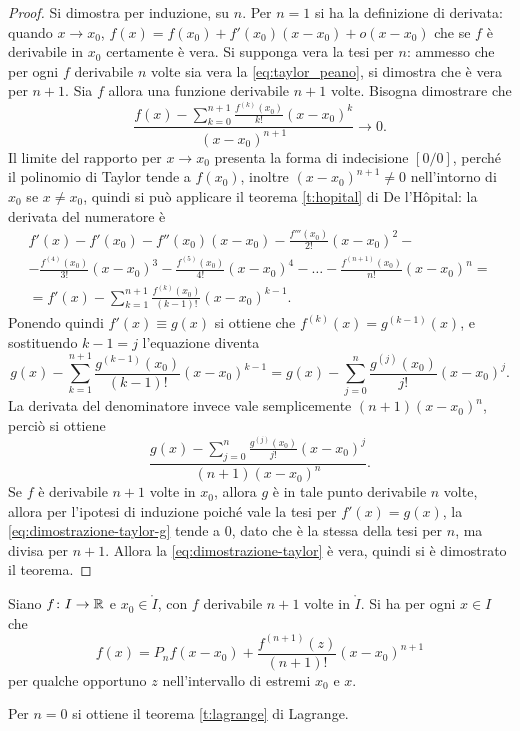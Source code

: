 \begin{proof}
Si dimostra per induzione, su $n$. Per $n=1$ si ha la definizione di derivata: quando $x\to x_0$, $f(x)=f(x_0)+f'(x_0)(x-x_0)+o(x-x_0)$ che se $f$ è derivabile in $x_0$ certamente è vera.
Si supponga vera la tesi per $n$: ammesso che per ogni $f$ derivabile $n$ volte sia vera la \eqref{eq:taylor_peano}, si dimostra che è vera per $n+1$. Sia $f$ allora una funzione derivabile $n+1$ volte. Bisogna dimostrare che
\begin{equation}
\label{eq:dimostrazione-taylor}
\frac{\displaystyle f(x)-\sum_{k=0}^{n+1}\frac{f^{(k)}(x_0)}{k!}(x-x_0)^k}{(x-x_0)^{n+1}}\to 0.
\end{equation}
Il limite del rapporto per $x\to x_0$ presenta la forma di indecisione $[0/0]$, perché il polinomio di Taylor tende a $f(x_0)$, inoltre $(x-x_0)^{n+1}\neq0$ nell'intorno di $x_0$ se $x\neq x_0$, quindi si può applicare il teorema \ref{t:hopital} di De l'H\^opital: la derivata del numeratore è
\begin{multline*}
f'(x)-f'(x_0)-f''(x_0)(x-x_0)-\frac{f'''(x_0)}{2!}(x-x_0)^2-\\
-\frac{f^{(4)}(x_0)}{3!}(x-x_0)^3-\frac{f^{(5)}(x_0)}{4!}(x-x_0)^4-\dots-\frac{f^{(n+1)}(x_0)}{n!}(x-x_0)^n=\\
=f'(x)-\sum_{k=1}^{n+1}\frac{f^{(k)}(x_0)}{(k-1)!}(x-x_0)^{k-1}.
\end{multline*}
Ponendo quindi $f'(x)\equiv g(x)$ si ottiene che $f^{(k)}(x)=g^{(k-1)}(x)$, e sostituendo $k-1=j$ l'equazione diventa
\[
g(x)-\sum_{k=1}^{n+1}\frac{g^{(k-1)}(x_0)}{(k-1)!}(x-x_0)^{k-1}=g(x)-\sum_{j=0}^{n}\frac{g^{(j)}(x_0)}{j!}(x-x_0)^j.
\]
La derivata del denominatore invece vale semplicemente $(n+1)(x-x_0)^n$, perciò si ottiene
\begin{equation}
\label{eq:dimostrazione-taylor-g}
\frac{\displaystyle g(x)-\sum_{j=0}^{n}\frac{g^{(j)}(x_0)}{j!}(x-x_0)^j}{(n+1)(x-x_0)^n}.
\end{equation}
Se $f$ è derivabile $n+1$ volte in $x_0$, allora $g$ è in tale punto derivabile $n$ volte, allora per l'ipotesi di induzione poiché vale la tesi per $f'(x)=g(x)$, la \eqref{eq:dimostrazione-taylor-g} tende a 0, dato che è la stessa della tesi per $n$, ma divisa per $n+1$. Allora la \eqref{eq:dimostrazione-taylor} è vera, quindi si è dimostrato il teorema.
\end{proof}
\begin{teorema}
\label{t:taylor_lagrange}
Siano $f\colon I\to\mathbb{R}$ e $x_0\in\mathring{I}$, con $f$ derivabile $n+1$ volte in $\mathring{I}$. Si ha per ogni $x\in I$ che
\begin{equation}
\label{eq:taylor_lagrange}
f(x)=P_nf(x-x_0)+\frac{f^{(n+1)}(z)}{(n+1)!}(x-x_0)^{n+1}
\end{equation}
per qualche opportuno $z$ nell'intervallo di estremi $x_0$ e $x$.
\end{teorema}
Per $n=0$ si ottiene il teorema \ref{t:lagrange} di Lagrange.

